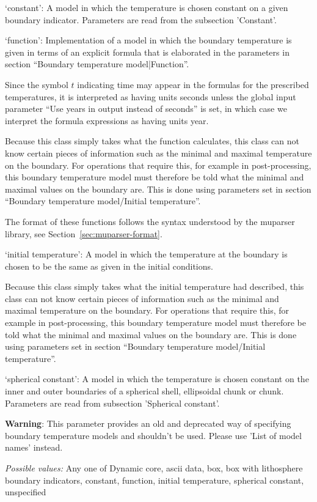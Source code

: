 \begin{itemize}
`constant': A model in which the temperature is chosen constant on a given boundary indicator.  Parameters are read from the subsection 'Constant'.

`function': Implementation of a model in which the boundary temperature is given in terms of an explicit formula that is elaborated in the parameters in section ``Boundary temperature model|Function''. 

Since the symbol $t$ indicating time may appear in the formulas for the prescribed temperatures, it is interpreted as having units seconds unless the global input parameter ``Use years in output instead of seconds'' is set, in which case we interpret the formula expressions as having units year.

Because this class simply takes what the function calculates, this class can not know certain pieces of information such as the minimal and maximal temperature on the boundary. For operations that require this, for example in post-processing, this boundary temperature model must therefore be told what the minimal and maximal values on the boundary are. This is done using parameters set in section ``Boundary temperature model/Initial temperature''.

The format of these functions follows the syntax understood by the muparser library, see Section~\ref{sec:muparser-format}.

`initial temperature': A model in which the temperature at the boundary is chosen to be the same as given in the initial conditions.

Because this class simply takes what the initial temperature had described, this class can not know certain pieces of information such as the minimal and maximal temperature on the boundary. For operations that require this, for example in post-processing, this boundary temperature model must therefore be told what the minimal and maximal values on the boundary are. This is done using parameters set in section ``Boundary temperature model/Initial temperature''.

`spherical constant': A model in which the temperature is chosen constant on the inner and outer boundaries of a spherical shell, ellipsoidal chunk or chunk. Parameters are read from subsection 'Spherical constant'.

\textbf{Warning}: This parameter provides an old and deprecated way of specifying boundary temperature models and shouldn't be used. Please use 'List of model names' instead.


{\it Possible values:} Any one of Dynamic core, ascii data, box, box with lithosphere boundary indicators, constant, function, initial temperature, spherical constant, unspecified
\end{itemize}



